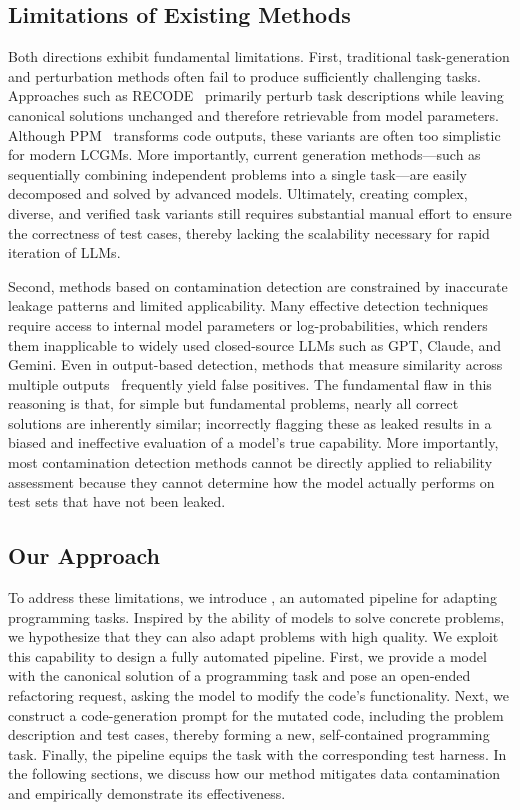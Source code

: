 \subsection{Limitations of Existing Methods}

Both directions exhibit fundamental limitations. First, traditional task-generation and perturbation methods often fail to produce sufficiently challenging tasks. Approaches such as RECODE~\cite{wang-etal-2023-recode} primarily perturb task descriptions while leaving canonical solutions unchanged and therefore retrievable from model parameters. Although PPM~\cite{10.1145/3643780} transforms code outputs, these variants are often too simplistic for modern LCGMs. More importantly, current generation methods---such as sequentially combining independent problems into a single task---are easily decomposed and solved by advanced models. Ultimately, creating complex, diverse, and verified task variants still requires substantial manual effort to ensure the correctness of test cases, thereby lacking the scalability necessary for rapid iteration of LLMs.

Second, methods based on contamination detection are constrained by inaccurate leakage patterns and limited applicability. Many effective detection techniques~\cite{nguyen2025rn} require access to internal model parameters or log-probabilities, which renders them inapplicable to widely used closed-source LLMs such as GPT, Claude, and Gemini. Even in output-based detection, methods that measure similarity across multiple outputs~\cite{dong-etal-2024-generalization} frequently yield false positives. The fundamental flaw in this reasoning is that, for simple but fundamental problems, nearly all correct solutions are inherently similar; incorrectly flagging these as leaked results in a biased and ineffective evaluation of a model's true capability. More importantly, most contamination detection methods cannot be directly applied to reliability assessment because they cannot determine how the model actually performs on test sets that have not been leaked.

\subsection{Our Approach}

To address these limitations, we introduce \tool{}, an automated pipeline for adapting programming tasks. Inspired by the ability of models to solve concrete problems, we hypothesize that they can also adapt problems with high quality. We exploit this capability to design a fully automated pipeline. First, we provide a model with the canonical solution of a programming task and pose an open-ended refactoring request, asking the model to modify the code's functionality. Next, we construct a code-generation prompt for the mutated code, including the problem description and test cases, thereby forming a new, self-contained programming task. Finally, the pipeline equips the task with the corresponding test harness. In the following sections, we discuss how our method mitigates data contamination and empirically demonstrate its effectiveness.

